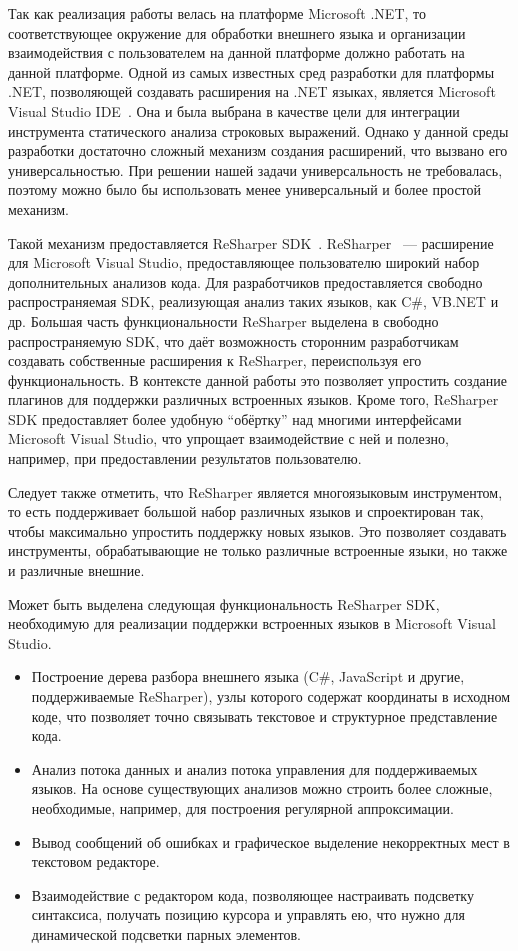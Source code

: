     Так как реализация работы велась на платформе Microsoft .NET, то соответствующее окружение для обработки внешнего языка и организации взаимодействия с пользователем на данной платформе должно работать на данной платформе. Одной из самых известных сред разработки для платформы .NET, позволяющей создавать расширения на .NET языках, является Microsoft Visual Studio IDE~\cite{MSVSIDE}. Она и была выбрана в качестве цели для интеграции инструмента статического анализа строковых выражений. Однако у данной среды разработки достаточно сложный механизм создания расширений, что вызвано его универсальностью. При решении нашей задачи универсальность не требовалась, поэтому можно было бы использовать менее универсальный и более простой механизм.

Такой механизм предоставляется ReSharper SDK~\cite{ReSharperSDK}.  ReSharper~\cite{ReSharper} --- расширение для Microsoft Visual Studio, предоставляющее пользователю широкий набор дополнительных анализов кода. Для разработчиков предоставляется свободно распространяемая SDK, реализующая анализ таких языков, как C\#, VB.NET и др. Большая часть функциональности ReSharper выделена в свободно распространяемую SDK, что даёт возможность сторонним разработчикам создавать собственные расширения к ReSharper, переиспользуя его функциональность. В контексте данной работы это позволяет упростить создание плагинов для поддержки различных встроенных языков. Кроме того, ReSharper SDK предоставляет более удобную ``обёртку'' над многими интерфейсами Microsoft Visual Studio, что упрощает взаимодействие с ней и полезно, например, при предоставлении результатов пользователю.

Следует также отметить, что ReSharper является многоязыковым инструментом, то есть поддерживает большой набор различных языков и спроектирован так, чтобы максимально упростить поддержку новых языков. Это позволяет создавать инструменты, обрабатывающие не только различные встроенные языки, но также и различные внешние.

Может быть выделена следующая функциональность ReSharper SDK, необходимую для реализации поддержки встроенных языков в Microsoft Visual Studio.  
\begin{itemize}
    \item Построение дерева разбора внешнего языка (C\#, JavaScript и другие, поддерживаемые ReSharper), узлы которого содержат координаты в исходном коде, что позволяет точно связывать текстовое и структурное представление кода.
    \item Анализ потока данных и анализ потока управления для поддерживаемых языков. На основе существующих анализов можно строить более сложные, необходимые, например, для построения регулярной аппроксимации.
    \item Вывод сообщений об ошибках и графическое выделение некорректных мест в текстовом редакторе.
    \item Взаимодействие с редактором кода, позволяющее настраивать подсветку синтаксиса, получать позицию курсора и управлять ею, что нужно для динамической подсветки парных элементов.
\end{itemize}

